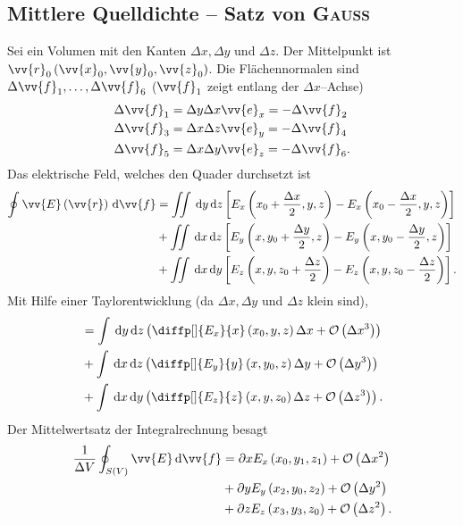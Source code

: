 \documentclass[a4paper,12pt]{article}
\newcommand{\td}{\,\text{d}}
\numberwithin{equation}{section}
\begin{document}
\subsection{Mittlere Quelldichte -- Satz von \textsc{Gauss}}
Sei ein Volumen mit den Kanten $\Delta x,\Delta y$ und $\Delta z$. Der Mittelpunkt ist $\vv{r}_0\left(\vv{x}_0,\vv{y}_0,\vv{z}_0\right)$. Die Flächennormalen sind $\Delta \vv{f}_1,\hdots ,\Delta \vv{f}_6$ ($\vv{f}_1$ zeigt entlang der $\Delta x$--Achse)
\begin{align} 
        \Delta \vv{f}_1&=\Delta y\Delta x\vv{e}_x=-\Delta \vv{f}_2\\
        \Delta \vv{f}_3&=\Delta x\Delta z\vv{e}_y=-\Delta \vv{f}_4\\
        \Delta \vv{f}_5&=\Delta x\Delta y\vv{e}_z=-\Delta \vv{f}_6
.\end{align} 
Das elektrische Feld, welches den Quader durchsetzt ist
\begin{align} 
        \oint_{}^{}\vv{E}\left(\vv{r}\right)\td \vv{f}&=\iint_{}^{}\td y\td z\left[E_x\left(x_0+\dfrac{\Delta x}{2},y,z\right)-E_x\left(x_0-\dfrac{\Delta x}{2},y,z\right)\right]\\
                                                      &+\iint_{}^{}\td x\td z\left[E_y\left(x,y_0+\dfrac{\Delta y}{2},z\right)-E_y\left(x,y_0-\dfrac{\Delta y}{2},z\right)\right]\\
                                                      &+\iint_{}^{}\td x\td y\left[E_z\left(x,y,z_0+\dfrac{\Delta z}{2}\right)-E_z\left(x,y,z_0-\dfrac{\Delta z}{2}\right)\right]
.\end{align} 
Mit Hilfe einer Taylorentwicklung (da $\Delta x,\Delta y$ und $\Delta z$ klein sind),
\begin{align} 
        &=\int_{}^{}\td y\td z\left(\diffp[]{E_x}{x}\left(x_0,y,z\right)\Delta x+\mathcal{O}\left(\Delta x^3\right)\right)\\
        &+\int_{}^{}\td x\td z\left(\diffp[]{E_y}{y}\left(x,y_0,z\right)\Delta y+\mathcal{O}\left(\Delta y^3\right)\right)\\
        &+\int_{}^{}\td x\td y\left(\diffp[]{E_z}{z}\left(x,y,z_0\right)\Delta z+\mathcal{O}\left(\Delta z^3\right)\right)
.\end{align} 
Der Mittelwertsatz der Integralrechnung besagt
\begin{align} 
        \dfrac{1}{\Delta V}\oint_{S\left(V\right)}^{}\vv{E}\td \vv{f}&=\partial x E_x\left(x_0,y_1,z_1\right)+\mathcal{O}\left(\Delta x^2\right)\\
                                                                     &+\partial y E_y\left(x_2,y_0,z_2\right)+\mathcal{O}\left(\Delta y^2\right)\\
                                                                     &+\partial z E_z\left(x_3,y_3,z_0\right)+\mathcal{O}\left(\Delta z^2\right)
.\end{align} 
\end{document}
